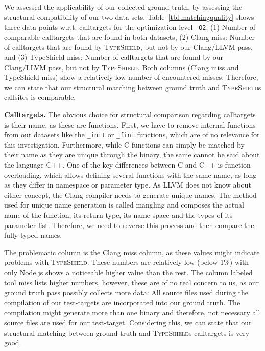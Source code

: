 We assessed the applicability of our collected ground truth, by assessing the structural compatibility of our two data sets. 
Table~\ref{tbl:matchingquality} shows three data points w.r.t. calltargets for the optimization level \texttt{-O2}:
(1) Number of comparable calltargets that are found in both datasets, 
(2) Clang miss: Number of calltargets that are found by \textsc{TypeShield}, but not by our Clang/LLVM pass, and 
(3) TypeShield miss: Number of calltargets that are found by our Clang/LLVM pass, but not by \textsc{TypeShield}.
Both columns (Clang miss and TypeShield miss) show a relatively low number of encountered misses. Therefore, we can 
state that our structural matching between ground truth and \textsc{TypeShield}s callsites is comparable.

\textbf{Calltargets.} The obvious choice for structural comparison regarding calltargets is their name, as these are functions. First, we have to remove internal 
functions from our datasets like the \texttt{\_init} or \texttt{\_fini} functions, which are of no relevance for this investigation. Furthermore, while C functions can
simply be matched by their name as they are unique through the binary, the same cannot be said about the language C++. One of the key differences between C and C++ is 
function overloading, which allows defining several functions with the same name, as long as they differ in namespace or parameter type. 
As LLVM does not know about either concept, the Clang compiler needs to generate unique names. The method used for unique name generation is called mangling and composes
the actual name of the function, its return type, its name-space and the types of its parameter list. Therefore, we need to reverse this process and then compare the fully
typed names. 

The problematic column is the Clang miss column, as these values might indicate problems with \textsc{TypeShield}. These numbers are relatively low (below 1\%) with only Node.js
shows a noticeable higher value than the rest. The column labeled tool miss lists higher numbers, however, these are of no real concern to us, as our ground truth 
pass possibly collects more data: All source files used during the compilation of our test-targets are incorporated into our ground truth. The compilation might generate more than
one binary and therefore, not necessary all source files are used for our test-target.
Considering this, we can state that our structural matching between ground truth and \textsc{TypeShield}s calltargets is very good.

